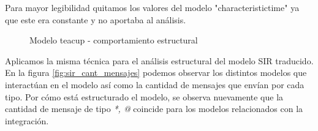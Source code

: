 Para mayor legibilidad quitamos los valores del modelo "characteristictime" ya que este era constante y no aportaba al análisis.


\begin{figure}[!h]
    \centering     %
        \caption{Modelo teacup - comportamiento estructural}
\end{figure}

Aplicamos la misma técnica para el análisis estructural del modelo SIR traducido.
En la figura \ref{fig:sir_cant_mensajes} podemos observar los distintos modelos que interactúan en el modelo así como la cantidad de mensajes que envían por cada tipo.
Por cómo está estructurado el modelo, se observa nuevamente que la cantidad de mensaje de tipo \textit{*, @} coincide para los modelos relacionados con la integración. 

